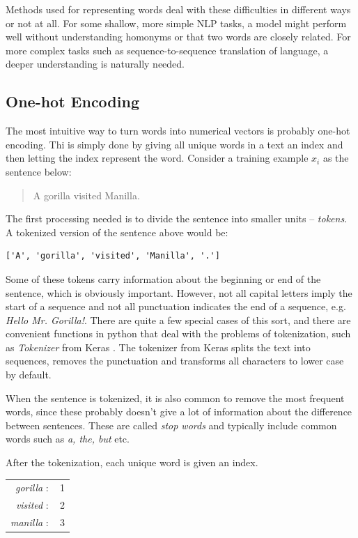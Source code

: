 Methods used for representing words deal with these difficulties in different ways or not at all. For some shallow, more simple NLP tasks, a model might perform well without understanding homonyms or that two words are closely related. For more complex tasks such as sequence-to-sequence translation of language, a deeper understanding is naturally needed.

\subsection{One-hot Encoding}
The most intuitive way to turn words into numerical vectors is probably one-hot encoding. Thi is simply done by giving all unique words in a text an index and then letting the index represent the word. Consider a training example $x_i$ as the sentence below:

\begin{quote}
A gorilla visited Manilla.
\end{quote}

The first processing needed is to divide the sentence into smaller units -- \emph{tokens}. A tokenized version of the sentence above would be:
\begin{verbatim}
['A', 'gorilla', 'visited', 'Manilla', '.']
\end{verbatim}

Some of these tokens carry information about the beginning or end of the sentence, which is obviously important. However, not all capital letters imply the start of a sequence and not all punctuation indicates the end of a sequence, e.g. \textit{Hello Mr. Gorilla!}. There are quite a few special cases of this sort, and there are convenient functions in python that deal with the problems of tokenization, such as \textit{Tokenizer} from Keras \citep{chollet2020keras}. The tokenizer from Keras splits the text into sequences, removes the punctuation and transforms all characters to lower case by default. 

When the sentence is tokenized, it is also common to remove the most frequent words, since these probably doesn't give a lot of information about the difference between sentences. These are called \textit{stop words} and typically include common words such as \textit{a, the, but} etc.

After the tokenization, each unique word is given an index. 
\begin{center}
    \begin{tabular}{rc}
        \textit{gorilla} $:$ & 1 \\
        \textit{visited} $:$ & 2 \\
        \textit{manilla} $:$ & 3 \\
    \end{tabular}
\end{center}


